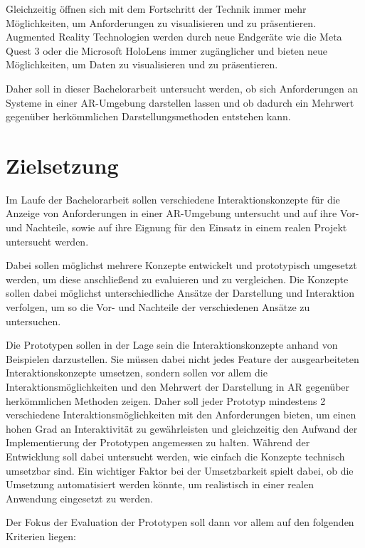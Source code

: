 Gleichzeitig öffnen sich mit dem Fortschritt der Technik immer mehr Möglichkeiten, um Anforderungen zu visualisieren und zu präsentieren.
Augmented Reality Technologien werden durch neue Endgeräte wie die Meta Quest 3 oder die Microsoft HoloLens immer zugänglicher und bieten neue Möglichkeiten, um Daten zu visualisieren und zu präsentieren.

Daher soll in dieser Bachelorarbeit untersucht werden, ob sich Anforderungen an Systeme in einer AR-Umgebung darstellen lassen und ob dadurch ein Mehrwert gegenüber herkömmlichen Darstellungsmethoden entstehen kann.


\section{Zielsetzung}

Im Laufe der Bachelorarbeit sollen verschiedene Interaktionskonzepte für die Anzeige von Anforderungen in einer AR-Umgebung untersucht und auf ihre Vor- und Nachteile, sowie auf ihre Eignung für den Einsatz in einem realen Projekt untersucht werden.

Dabei sollen möglichst mehrere Konzepte entwickelt und prototypisch umgesetzt werden, um diese anschließend zu evaluieren und zu vergleichen.
Die Konzepte sollen dabei möglichst unterschiedliche Ansätze der Darstellung und Interaktion verfolgen, um so die Vor- und Nachteile der verschiedenen Ansätze zu untersuchen.

Die Prototypen sollen in der Lage sein die Interaktionskonzepte anhand von Beispielen darzustellen.
Sie müssen dabei nicht jedes Feature der ausgearbeiteten Interaktionskonzepte umsetzen, sondern sollen vor allem die Interaktionsmöglichkeiten und den Mehrwert der Darstellung in AR gegenüber herkömmlichen Methoden zeigen.
Daher soll jeder Prototyp mindestens 2 verschiedene Interaktionsmöglichkeiten mit den Anforderungen bieten, um einen hohen Grad an Interaktivität zu gewährleisten und gleichzeitig den Aufwand der Implementierung der Prototypen angemessen zu halten.
Während der Entwicklung soll dabei untersucht werden, wie einfach die Konzepte technisch umsetzbar sind.
Ein wichtiger Faktor bei der Umsetzbarkeit spielt dabei, ob die Umsetzung automatisiert werden könnte, um realistisch in einer realen Anwendung eingesetzt zu werden.

Der Fokus der Evaluation der Prototypen soll dann vor allem auf den folgenden Kriterien liegen:

